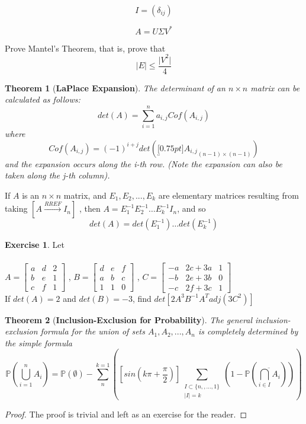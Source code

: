 \documentclass[12pt a]{article}
\newtheorem{theorem}{Theorem}
\theoremstyle{definition}
\theoremstyle{definition}
\newtheorem{exercise}{Exercise}
\theoremstyle{definition}
\begin{document}
{$$I=(\delta_{ij})$$

$$A=U{\Sigma}V^{*}$$



Prove Mantel's Theorem, that is, prove that
\begin{equation}
	|E| \leq \frac{{|V}^2|}{4}
\end{equation}

\begin{theorem}[\textbf{LaPlace Expansion}]
	The determinant of an $n\times n$ matrix can be calculated as follows: 
	$$det(A)=\sum_{i=1}^{n} a_{i,j}Cof(A_{i,j})$$
	where 
	$$Cof(A_{i,j})=(-1)^{i+j}det\left( \underbracket[0.75pt]{A_{i,j}}_{\text{$(n-1) \times (n-1)$}} \right)$$
	and the expansion occurs along the i-th row. (Note the expansion can also be taken along the j-th column). 
\end{theorem}

If $A$ is an $n \times n$ matrix, and $E_1,E_2,...,E_k$ are elementary matrices resulting from taking $[A \overset{RREF}{\to} I_n]$ , then $A=E_1^{-1}E_2^{-1}\dots E_k^{-1}I_n$, and so
$$det(A)=det(E_1^{-1})\dots det(E_k^{-1})$$

\theoremstyle{definition}
\begin{exercise}
	Let \\ \\
	$A = \begin{bmatrix}
	a & d & 2 \\
	b & e & 1 \\ 
	c & f & 1 
	\end{bmatrix}$ , 
	$B = \begin{bmatrix}
	d & e & f \\
	a & b & c \\ 
	1 & 1 & 0 
	\end{bmatrix}$ , 
	$C = \begin{bmatrix}
	-a & 2c + 3a & 1 \\
	-b & 2e + 3b & 0 \\ 
	-c & 2f + 3c & 1  
	\end{bmatrix}$ \\ 
	
	If $det(A)=2$ and $det(B)=-3$, find $det[2A^{3}B^{-1}A^{T}adj(3C^2)]$
\end{exercise}

\begin{theorem}[\textbf{Inclusion-Exclusion for Probability}]
	The general inclusion-exclusion formula for the union of sets $A_1,A_2,...,A_n$ is completely determined by the simple formula
	$$\mathbb{P}\left(\bigcup_{i=1}^{n} A_{i} \right) = \mathbb{P}(\emptyset) -\sum_{n}^{k=1} 
	\left( \left[ sin\left( k\pi + \frac{\pi}{2} \right) \right]  \sum_{ 
		\substack{I\subset \{ n,,...,1 \} \\ |I|=k } } \left(1- \mathbb{P}\left(  \overline{ \bigcap_{i \in I} A_i} \right)  \right)  \right)$$
\end{theorem}
\begin{proof}
	The proof is trivial and left as an exercise for the reader.
\end{proof}


}
\end{document}
